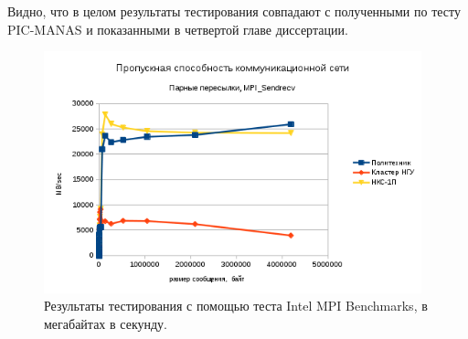Видно, что в целом результаты тестирования совпадают с полученными по тесту PIC-MANAS и показанными в четвертой главе диссертации.


\begin{figure}[htb]
	\begin{center}
		\includegraphics[height=7cm,keepaspectratio]{images/imb.png}
	\end{center}
	\caption{Результаты тестирования с помощью теста Intel MPI Benchmarks, в мегабайтах в секунду.}
	\label{IMB}
\end{figure}

			